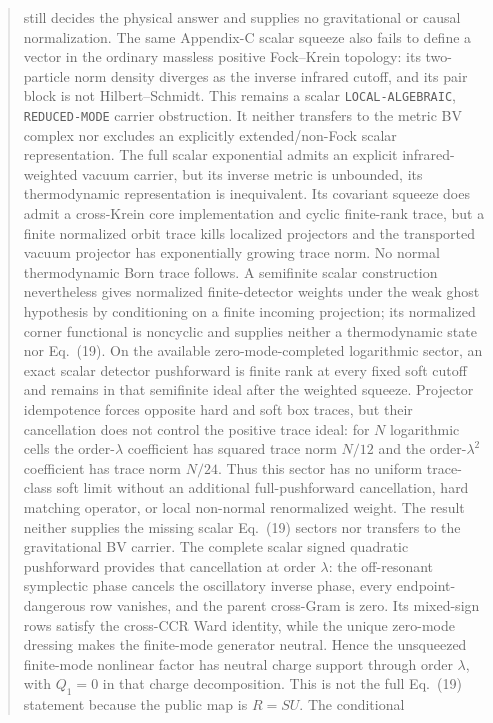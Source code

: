 \documentclass[11pt]{article}
\theoremstyle{definition}
\theoremstyle{remark}
\begin{document}
\begin{abstract}
still decides the physical answer and supplies no gravitational or causal
normalization.
The same Appendix-C scalar squeeze also fails to define a vector in the
ordinary massless positive Fock--Krein topology: its two-particle norm density
diverges as the inverse infrared cutoff, and its pair block is not
Hilbert--Schmidt.  This remains a scalar
\texttt{LOCAL-ALGEBRAIC}, \texttt{REDUCED-MODE} carrier obstruction.  It
neither transfers to the metric BV complex nor excludes an explicitly
extended/non-Fock scalar representation.
The full scalar exponential admits an explicit infrared-weighted vacuum
carrier, but its inverse metric is unbounded, its thermodynamic representation
is inequivalent.  Its covariant squeeze does admit a cross-Krein core
implementation and cyclic finite-rank trace, but a finite normalized orbit
trace kills localized projectors and the transported vacuum projector has
exponentially growing trace norm.  No normal thermodynamic Born trace follows.
A semifinite scalar construction nevertheless gives normalized finite-detector
weights under the weak ghost hypothesis by conditioning on a finite incoming
projection; its normalized corner functional is noncyclic and supplies neither
a thermodynamic state nor Eq.~(19).
On the available zero-mode-completed logarithmic sector, an exact scalar
detector pushforward is finite rank at every fixed soft cutoff and remains in
that semifinite ideal after the weighted squeeze.  Projector idempotence forces
opposite hard and soft box traces, but their cancellation does not control the
positive trace ideal: for $N$ logarithmic cells the order-$\lambda$ coefficient
has squared trace norm $N/12$ and the order-$\lambda^2$ coefficient has trace
norm $N/24$.  Thus this sector has no uniform trace-class soft limit without an
additional full-pushforward cancellation, hard matching operator, or local
non-normal renormalized weight.  The result neither supplies the missing
scalar Eq.~(19) sectors nor transfers to the gravitational BV carrier.
The complete scalar signed quadratic pushforward provides that cancellation
at order $\lambda$: the off-resonant symplectic phase cancels the oscillatory
inverse phase, every endpoint-dangerous row vanishes, and the parent cross-Gram
is zero.  Its mixed-sign rows satisfy the cross-CCR Ward identity, while the
unique zero-mode dressing makes the finite-mode generator neutral.  Hence the
unsqueezed finite-mode nonlinear factor has neutral charge support through
order $\lambda$, with $Q_1=0$ in that charge decomposition.  This is not the
full Eq.~(19) statement because the public map is $R=S U$.  The conditional

\end{abstract}
\end{document}
